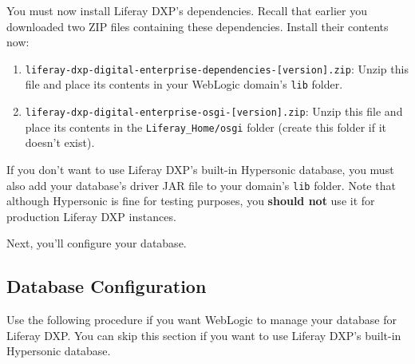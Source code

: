 You must now install Liferay DXP's dependencies. Recall that earlier you
downloaded two ZIP files containing these dependencies. Install their
contents now:

\begin{enumerate}
\def\labelenumi{\arabic{enumi}.}
\item
  \texttt{liferay-dxp-digital-enterprise-dependencies-{[}version{]}.zip}:
  Unzip this file and place its contents in your WebLogic domain's
  \texttt{lib} folder.
\item
  \texttt{liferay-dxp-digital-enterprise-osgi-{[}version{]}.zip}: Unzip
  this file and place its contents in the \texttt{Liferay\_Home/osgi}
  folder (create this folder if it doesn't exist).
\end{enumerate}

If you don't want to use Liferay DXP's built-in Hypersonic database, you
must also add your database's driver JAR file to your domain's
\texttt{lib} folder. Note that although Hypersonic is fine for testing
purposes, you \textbf{should not} use it for production Liferay DXP
instances.

Next, you'll configure your database.

\subsection{Database Configuration}\label{database-configuration-3}

Use the following procedure if you want WebLogic to manage your database
for Liferay DXP. You can skip this section if you want to use
Liferay DXP's built-in Hypersonic database.

